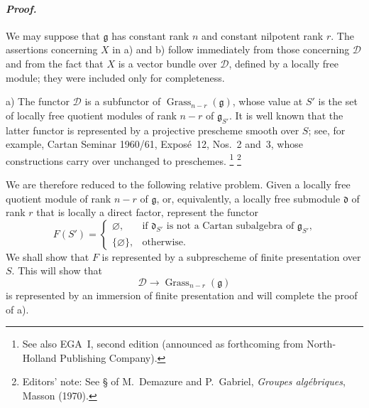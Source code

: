 

\paragraph{\textit{Proof.}}
We may suppose that \(\mathfrak g\) has constant rank \(n\) and
constant nilpotent rank \(r\). The assertions concerning \(X\) in
\textup{a)} and \textup{b)} follow immediately from those concerning
\(\mathcal D\) and from the fact that \(X\) is a vector bundle over
\(\mathcal D\), defined by a locally free module; they were included
only for completeness.

\medskip
\noindent\textup{a)}
The functor \(\mathcal D\) is a subfunctor of
\(\operatorname{Grass}_{n-r}(\mathfrak g)\), whose value at \(S'\)
is the set of locally free quotient modules of rank \(n-r\) of
\(\mathfrak g_{S'}\). It is well known that the latter functor is
represented by a projective prescheme smooth over \(S\); see, for
example, Cartan Seminar 1960/61, Exposé~12, Nos.~2 and~3, whose
constructions carry over unchanged to preschemes.\begingroup
\renewcommand{\thefootnote}{*}\footnote{See also EGA~I, second
edition \textup{(announced as forthcoming from North-Holland
Publishing Company)}.}
\endgroup\footnote{Editors' note: See \S {} of M.~Demazure and
P.~Gabriel, \emph{Groupes algébriques}, Masson \textup{(1970)}.}

We are therefore reduced to the following relative problem. Given
a locally free quotient module of rank \(n-r\) of \(\mathfrak g\),
or, equivalently, a locally free submodule \(\mathfrak d\) of rank
\(r\) that is locally a direct factor, represent the functor
\[
 F(S')=
 \begin{cases}
   \varnothing,
     &\text{if \(\mathfrak d_{S'}\) is not a Cartan subalgebra of
       \(\mathfrak g_{S'}\),}\\
   \{\varnothing\},
     &\text{otherwise.}
 \end{cases}
\]
We shall show that \(F\) is represented by a subprescheme of finite
presentation over \(S\). This will show that
\[
  \mathcal D\longrightarrow
  \operatorname{Grass}_{n-r}(\mathfrak g)
\]
is represented by an immersion of finite presentation and will
complete the proof of \textup{a)}.


